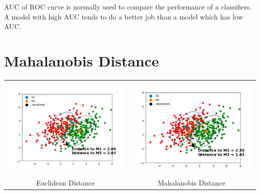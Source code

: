 \documentclass{article}
\begin{document}
\indent AUC of ROC curve is normally used to compare the performance of a classifiers. A model with high AUC tends to do a better job than a model which has low AUC.

\section{Mahalanobis Distance}

\begin{center}
\begin{tabular}{cc}
\includegraphics[scale=0.25]{distance} &
\includegraphics[scale=0.25]{m_distance} \\
\scriptsize Euclidean Distance &
\scriptsize Mahalanobis Distance \\
\end{tabular}
\end{center}
\end{document}
